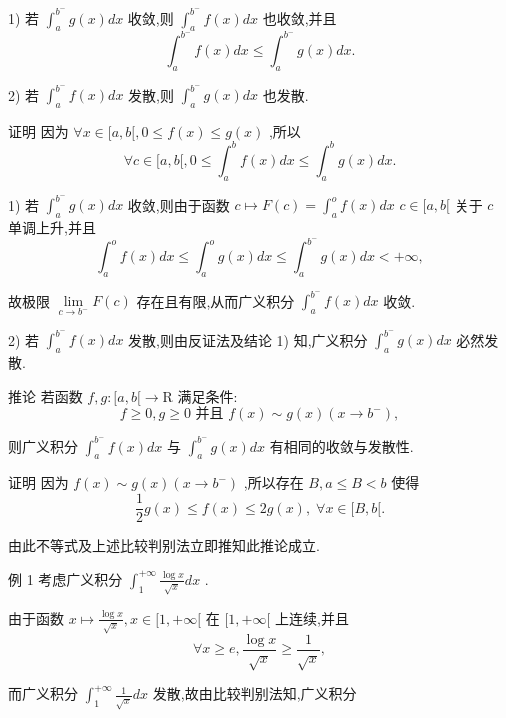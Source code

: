 1) 若 ${\int }_{a}^{{b}^{ - }}g\left( x\right) {dx}$ 收敛,则 ${\int }_{a}^{{b}^{ - }}f\left( x\right) {dx}$ 也收敛,并且
$${\int }_{a}^{{b}^{ - }}f\left( x\right) {dx} \leq  {\int }_{a}^{{b}^{ - }}g\left( x\right) {dx}.$$

2) 若 ${\int }_{a}^{{b}^{ - }}f\left( x\right) {dx}$ 发散,则 ${\int }_{a}^{{b}^{ - }}g\left( x\right) {dx}$ 也发散.

证明 因为 $\forall x \in  \lbrack a,b\lbrack ,0 \leq  f\left( x\right)  \leq  g\left( x\right)$ ,所以
$$\forall c \in  \lbrack a,b\lbrack ,0 \leq  {\int }_{a}^{b}f\left( x\right) {dx} \leq  {\int }_{a}^{b}g\left( x\right) {dx}.$$

1) 若 ${\int }_{a}^{{b}^{ - }}g\left( x\right) {dx}$ 收敛,则由于函数 $c \mapsto  F\left( c\right)  = {\int }_{a}^{o}f\left( x\right) {dx}$  $c \in  \lbrack a,b\lbrack$ 关于 $c$ 单调上升,并且
$${\int }_{a}^{o}f\left( x\right) {dx} \leq  {\int }_{a}^{o}g\left( x\right) {dx} \leq  {\int }_{a}^{{b}^{ - }}g\left( x\right) {dx} <  + \infty ,$$

故极限 $\mathop{\lim }\limits_{{c \rightarrow  {b}^{ - }}}F\left( c\right)$ 存在且有限,从而广义积分 ${\int }_{a}^{{b}^{ - }}f\left( x\right) {dx}$ 收敛.

2) 若 ${\int }_{a}^{{b}^{ - }}f\left( x\right) {dx}$ 发散,则由反证法及结论 1) 知,广义积分 ${\int }_{a}^{{b}^{ - }}g\left( x\right) {dx}$ 必然发散.

推论 若函数 $f,g : \lbrack a,b\lbrack  \rightarrow  \mathrm{R}$ 满足条件:
$$f \geq  0,g \geq  0\text{ 并且 }f\left( x\right)  \sim  g\left( x\right) \left( {x \rightarrow  {b}^{ - }}\right) ,$$

则广义积分 ${\int }_{a}^{{b}^{ - }}f\left( x\right) {dx}$ 与 ${\int }_{a}^{{b}^{ - }}g\left( x\right) {dx}$ 有相同的收敛与发散性.

证明 因为 $f\left( x\right)  \sim  g\left( x\right) \left( {x \rightarrow  {b}^{ - }}\right)$ ,所以存在 $B,a \leq  B < b$ 使得
$$\frac{1}{2}g\left( x\right)  \leq  f\left( x\right)  \leq  {2g}\left( x\right) ,\;\forall x \in  \lbrack B,b\lbrack .$$

由此不等式及上述比较判别法立即推知此推论成立.

例 1 考虑广义积分 ${\int }_{1}^{+\infty }\frac{\log x}{\sqrt{x}}{dx}$ .

由于函数 $x \mapsto  \frac{\log x}{\sqrt{x}},x \in  \lbrack 1, + \infty \lbrack$ 在 $\lbrack 1, + \infty \lbrack$ 上连续,并且
$$\forall x \geq  e,\frac{\log x}{\sqrt{x}} \geq  \frac{1}{\sqrt{x}},$$

而广义积分 ${\int }_{1}^{+\infty }\frac{1}{\sqrt{x}}{dx}$ 发散,故由比较判别法知,广义积分

